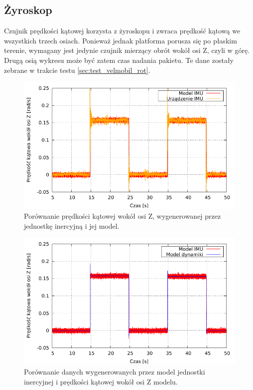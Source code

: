 	\subsection{Żyroskop}
		Czujnik prędkości kątowej korzysta z żyroskopu i zwraca prędkość kątową we wszystkich trzech osiach.
		Ponieważ jednak platforma porusza się po płaskim terenie, wymagany jest jedynie czujnik mierzący obrót wokół osi Z, czyli w górę.
		Drugą osią wykresu może być zatem czas nadania pakietu. Te dane zostały zebrane w trakcie testu \ref{sec:test_velmobil_rot}.
		
		\begin{figure}[H]
			\centering
			\includegraphics[width=\textwidth]{plots/angimu_at.pdf}
				\caption{Porównanie prędkości kątowej wokół osi Z, wygenerowanej przez jednostkę inercyjną i jej model.}
			\label{plot:angimu_at}
		\end{figure}
		
		\begin{figure}[h]
			\centering
			\includegraphics[width=\textwidth]{plots/angimu_at_w.pdf}
				\caption{Porównanie danych wygenerowanych przez model jednostki inercyjnej i prędkości kątowej wokół osi Z modelu.}
			\label{plot:angimu_at_w}
		\end{figure}
		
